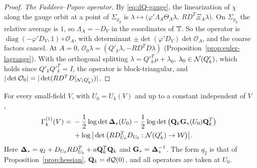 \begin{proof}
\emph{The Faddeev--Popov operator.} By \eqref{eq:dQ-gauge}, the linearization of $\chi$ along the gauge orbit at a point of $\Sigma_{\varrho_g}$ is $\lambda\mapsto\big(\varphi'\Lambda_A\Theta_A\lambda,\ RD^T\Xi_A\lambda\big)$. On $\Sigma_{\varrho_g}$ the relative average is $1$, so $\Lambda_A=-D_V$ in the coordinates of $\mathbb T$. So the operator is $\operatorname{diag}(-\varphi'D_V,1)\circ\mathcal O_A$, with determinant $\pm\det(\varphi'D_V)\det\mathcal O_A$, and the coarse factors cancel. At $A=0$, $\mathcal O_0\lambda=(Q'_k\lambda,-RD^TD\lambda)$ (Proposition~\ref{prop:euler-lagrange}). With the orthogonal splitting $\lambda=Q'^T_k\mu+\lambda_0$, $\lambda_0\in\mathcal N(Q'_k)$, which holds since $Q'_kQ'^T_k=I$, the operator is block-triangular, and $|\det\mathcal O_0|=|\det(RD^TD|_{\mathcal N(Q'_k)})|$.
\end{proof}

\begin{theorem}\label{thm:ol-chart}
For every small-field $V$, with $U_0=U_k(V)$ and up to a constant independent of $V$,
\[
\begin{aligned}
\Gamma^{(1)}_k(V)={}&-\frac12\log\det\boldsymbol{\Delta}_*(U_0)-\frac12\log\det\big(\mathbf Q_k\mathbf G_*(U_0)\mathbf Q_k^T\big)\\
&+\log\big|\det\big(RD^T_{U_0}D_{U_0}:\mathcal N(Q'_k)\to\mathcal W\big)\big| .
\end{aligned}
\]
Here $\boldsymbol{\Delta}_*=q_2+D_{U_0}RD^T_{U_0}+a\mathbf Q_k^T\mathbf Q_k$ and $\mathbf G_*=\boldsymbol{\Delta}_*^{-1}$. The form $q_2$ is that of Proposition~\ref{prop:hessian}, $\mathbf Q_k=d\mathcal Q(0)$, and all operators are taken at $U_0$.
\end{theorem}

